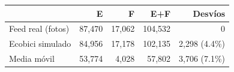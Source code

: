 \begin{tabular}{@{}lrrrr@{}}
\toprule
 & E & F & E+F & Desvíos \\
\midrule
Feed real (fotos) & 87,470 & 17,062 & 104,532 & 0 \\
Ecobici simulado & 84,956 & 17,178 & 102,135 & 2,298 (4.4\%) \\
Media móvil & 53,774 & 4,028 & 57,802 & 3,706 (7.1\%) \\
\bottomrule
\end{tabular}
